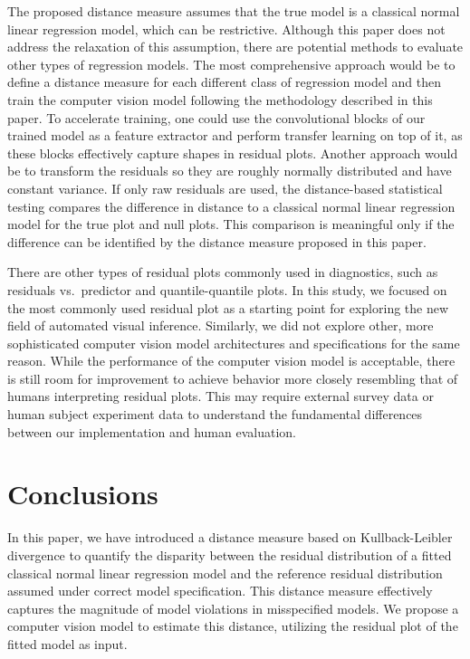 \documentclass[]{interact}
\theoremstyle{plain}%
\theoremstyle{definition}
\theoremstyle{remark}
\begin{document}
The proposed distance measure assumes that the true model is a classical
normal linear regression model, which can be restrictive. Although this
paper does not address the relaxation of this assumption, there are
potential methods to evaluate other types of regression models. The most
comprehensive approach would be to define a distance measure for each
different class of regression model and then train the computer vision
model following the methodology described in this paper. To accelerate
training, one could use the convolutional blocks of our trained model as
a feature extractor and perform transfer learning on top of it, as these
blocks effectively capture shapes in residual plots. Another approach
would be to transform the residuals so they are roughly normally
distributed and have constant variance. If only raw residuals are used,
the distance-based statistical testing compares the difference in
distance to a classical normal linear regression model for the true plot
and null plots. This comparison is meaningful only if the difference can
be identified by the distance measure proposed in this paper.

There are other types of residual plots commonly used in diagnostics,
such as residuals vs.~predictor and quantile-quantile plots. In this
study, we focused on the most commonly used residual plot as a starting
point for exploring the new field of automated visual inference.
Similarly, we did not explore other, more sophisticated computer vision
model architectures and specifications for the same reason. While the
performance of the computer vision model is acceptable, there is still
room for improvement to achieve behavior more closely resembling that of
humans interpreting residual plots. This may require external survey
data or human subject experiment data to understand the fundamental
differences between our implementation and human evaluation.

\section{Conclusions}\label{conclusions}

In this paper, we have introduced a distance measure based on
Kullback-Leibler divergence to quantify the disparity between the
residual distribution of a fitted classical normal linear regression
model and the reference residual distribution assumed under correct
model specification. This distance measure effectively captures the
magnitude of model violations in misspecified models. We propose a
computer vision model to estimate this distance, utilizing the residual
plot of the fitted model as input.
\end{document}
